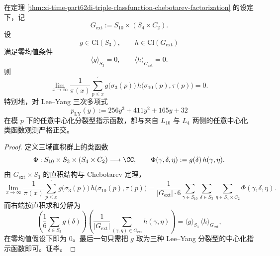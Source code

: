 \begin{corollary}\label{cor:xi-time-part62di-s3-external-centered-orthogonality}
在定理 \ref{thm:xi-time-part62di-triple-classfunction-chebotarev-factorization} 的设定下，记
\[
G_{\mathrm{ext}}:=S_{10}\times (S_4\times C_2).
\]
设
\[
g\in \mathrm{Cl}(S_3),
\qquad
h\in \mathrm{Cl}(G_{\mathrm{ext}})
\]
满足零均值条件
\[
\langle g\rangle_{S_3}=0,
\qquad
\langle h\rangle_{G_{\mathrm{ext}}}=0.
\]
则
\[
\lim_{x\to\infty}\frac{1}{\pi(x)}
\sum_{p\le x}^{\prime}
g\!\bigl(\sigma_3(p)\bigr)\,
h\!\bigl(\sigma_{10}(p),\tau(p)\bigr)
=0.
\]
特别地，对 Lee--Yang 三次多项式
\[
p_{\mathrm{LY}}(y):=256y^3+411y^2+165y+32
\]
在模 \(p\) 下的任意中心化分裂型指示函数，都与来自 \(L_{10}\) 与 \(L_4\) 两侧的任意中心化类函数观测严格正交。
\end{corollary}
\begin{proof}
定义三域直积群上的类函数
\[
\Phi:S_{10}\times S_3\times (S_4\times C_2)\longrightarrow \CC,
\qquad
\Phi(\gamma,\delta,\eta):=g(\delta)\,h(\gamma,\eta).
\]
由 \(G_{\mathrm{ext}}\times S_3\) 的直积结构与 Chebotarev 定理，
\[
\lim_{x\to\infty}\frac{1}{\pi(x)}
\sum_{p\le x}^{\prime}
g\!\bigl(\sigma_3(p)\bigr)\,
h\!\bigl(\sigma_{10}(p),\tau(p)\bigr)
=
\frac{1}{|G_{\mathrm{ext}}|\cdot 6}
\sum_{\gamma\in S_{10}}
\sum_{\delta\in S_3}
\sum_{\eta\in S_4\times C_2}
\Phi(\gamma,\delta,\eta).
\]
而右端按直积求和分解为
\[
\left(\frac{1}{6}\sum_{\delta\in S_3}g(\delta)\right)
\left(
\frac{1}{|G_{\mathrm{ext}}|}
\sum_{(\gamma,\eta)\in G_{\mathrm{ext}}}
h(\gamma,\eta)
\right)
=
\langle g\rangle_{S_3}\,\langle h\rangle_{G_{\mathrm{ext}}},
\]
在零均值假设下即为 \(0\)。最后一句只需把 \(g\) 取为三种 Lee--Yang 分裂型的中心化指示函数即可。证毕。
\end{proof}

